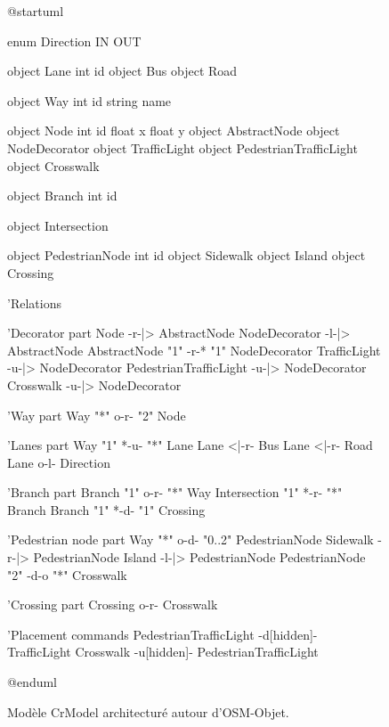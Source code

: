 \begin{figure}[ht]
    \centering
    \begin{plantuml}
        @startuml

        enum Direction {
            IN
            OUT
        }

        object Lane {
            int id
        }
        object Bus
        object Road

        object Way {
            int id
            string name
        }

        object Node {
            int id
            float x
            float y
        }
        object AbstractNode
        object NodeDecorator
        object TrafficLight
        object PedestrianTrafficLight
        object Crosswalk

        object Branch {
            int id
        }

        object Intersection

        object PedestrianNode {
            int id
        }
        object Sidewalk
        object Island
        object Crossing

        'Relations

        'Decorator part
        Node -r-|> AbstractNode
        NodeDecorator -l-|> AbstractNode
        AbstractNode "1" -r-* "1" NodeDecorator
        TrafficLight -u-|> NodeDecorator
        PedestrianTrafficLight -u-|> NodeDecorator
        Crosswalk -u-|> NodeDecorator

        'Way part
        Way "*" o-r- "2" Node

        'Lanes part
        Way "1" *-u- "*" Lane
        Lane <|-r- Bus
        Lane <|-r- Road
        Lane o-l- Direction

        'Branch part
        Branch "1" o-r- "*" Way
        Intersection "1" *-r- "*" Branch
        Branch "1" *-d- "1" Crossing

        'Pedestrian node part
        Way "*" o-d- "0..2" PedestrianNode
        Sidewalk -r-|> PedestrianNode
        Island -l-|> PedestrianNode
        PedestrianNode "2" -d-o "*" Crosswalk

        'Crossing part
        Crossing o-r- Crosswalk

        'Placement commands
        PedestrianTrafficLight -d[hidden]- TrafficLight
        Crosswalk -u[hidden]- PedestrianTrafficLight

        @enduml 
    \end{plantuml}
    \caption[Modèle CrModel.]{Modèle CrModel architecturé autour d'OSM-Objet.}
    \label{fig:modelisation_crmodel}
\end{figure}

